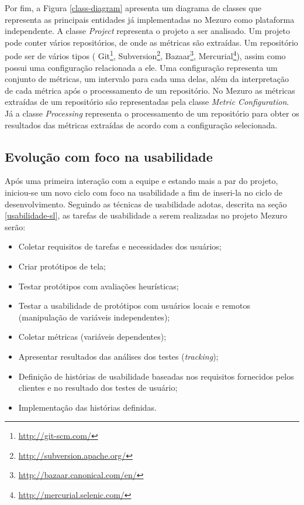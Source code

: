 Por fim, a Figura \ref{class-diagram} apresenta um diagrama de classes que representa as principais entidades já implementadas no Mezuro como plataforma independente. A classe \textit{Project} representa o projeto a ser analisado. Um projeto pode conter vários repositórios, de onde as métricas são extraídas.  Um repositório pode ser de vários tipos ( Git\footnote{\url{http://git-scm.com/}}, Subversion\footnote{\url{http://subversion.apache.org/}}, Bazaar\footnote{\url{http://bazaar.canonical.com/en/}},  Mercurial\footnote{\url{http://mercurial.selenic.com/}}), assim como possui uma configuração relacionada a ele.  Uma configuração representa um conjunto de métricas, um intervalo para cada uma delas, além da interpretação de cada métrica após o processamento de um repositório. No Mezuro as métricas extraídas de um repositório são representadas pela classe \textit{Metric Configuration}. Já a classe \textit{Processing} representa o processamento de um repositório para obter os resultados das métricas extraídas de acordo com a configuração selecionada.

%
\subsection{Evolução com foco na usabilidade}
\label{evolucao-usabilidade}

Após uma primeira interação com a equipe e estando mais a par do projeto, iniciou-se um novo ciclo com foco na usabilidade a fim de inseri-la no ciclo de desenvolvimento. Seguindo as técnicas de usabilidade adotas, descrita na seção \ref{usabilidade-sl}, as tarefas de usabilidade a serem realizadas no projeto Mezuro serão:
\begin{itemize}
\item Coletar requisitos de tarefas e necessidades dos usuários;
\item Criar protótipos de tela;
\item Testar protótipos com avaliações heurísticas;
\item Testar a usabilidade de protótipos com usuários locais e remotos (manipulação de variáveis independentes);
\item Coletar métricas (variáveis dependentes);
\item Apresentar resultados das análises dos testes (\textit{tracking});
\item Definição de histórias de usabilidade baseadas nos requisitos fornecidos pelos clientes e no resultado dos testes de usuário;
\item Implementação das histórias definidas.
\end{itemize}

